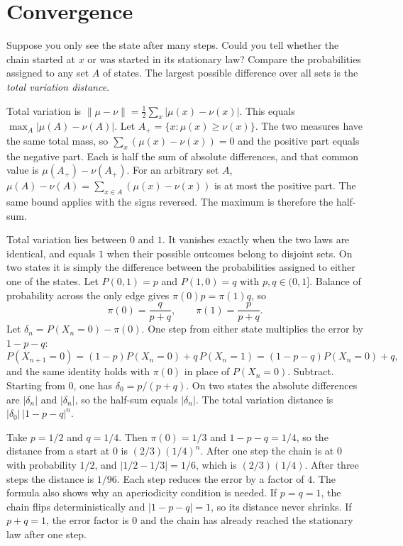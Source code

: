 \section{Convergence}

Suppose you only see the state after many steps. Could you tell whether the chain started at $x$ or was started in its stationary law? Compare the probabilities assigned to any set $A$ of states. The largest possible difference over all sets is the \emph{total variation distance}.

Total variation is $\|\mu-\nu\|=\frac12\sum_x|\mu(x)-\nu(x)|$. This equals $\max_A|\mu(A)-\nu(A)|$. Let $A_+=\{x:\mu(x)\ge\nu(x)\}$. The two measures have the same total mass, so $\sum_x(\mu(x)-\nu(x))=0$ and the positive part equals the negative part. Each is half the sum of absolute differences, and that common value is $\mu(A_+)-\nu(A_+)$. For an arbitrary set $A$, $\mu(A)-\nu(A)=\sum_{x\in A}(\mu(x)-\nu(x))$ is at most the positive part. The same bound applies with the signs reversed. The maximum is therefore the half-sum.

Total variation lies between $0$ and $1$. It vanishes exactly when the two laws are identical, and equals $1$ when their possible outcomes belong to disjoint sets. On two states it is simply the difference between the probabilities assigned to either one of the states. Let $P(0,1)=p$ and $P(1,0)=q$ with $p,q\in(0,1]$. Balance of probability across the only edge gives $\pi(0)p=\pi(1)q$, so
\[
 \pi(0)=\frac{q}{p+q},\qquad \pi(1)=\frac{p}{p+q}.
\]
Let $\delta_n=P(X_n=0)-\pi(0)$. One step from either state multiplies the error by $1-p-q$:
\[
 P(X_{n+1}=0)=(1-p)P(X_n=0)+q\,P(X_n=1)
 =(1-p-q)P(X_n=0)+q,
\]
and the same identity holds with $\pi(0)$ in place of $P(X_n=0)$. Subtract. Starting from $0$, one has $\delta_0=p/(p+q)$. On two states the absolute differences are $|\delta_n|$ and $|\delta_n|$, so the half-sum equals $|\delta_n|$. The total variation distance is $|\delta_0|\,|1-p-q|^n$.

Take $p=1/2$ and $q=1/4$. Then $\pi(0)=1/3$ and $1-p-q=1/4$, so the distance from a start at $0$ is $(2/3)(1/4)^n$. After one step the chain is at $0$ with probability $1/2$, and $|1/2-1/3|=1/6$, which is $(2/3)(1/4)$. After three steps the distance is $1/96$. Each step reduces the error by a factor of $4$. The formula also shows why an aperiodicity condition is needed. If $p=q=1$, the chain flips deterministically and $|1-p-q|=1$, so its distance never shrinks. If $p+q=1$, the error factor is $0$ and the chain has already reached the stationary law after one step.

